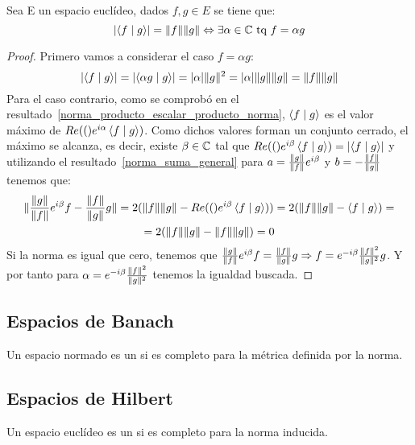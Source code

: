 \begin{resultado}
  Sea E un espacio euclídeo, dados $f,g\in E$ se tiene que:
  \begin{equation}
    \label{norma_producto_escalar_igual_producto_norma}
    \lvert\left\langle f\mid g\right\rangle\rvert=\lVert f\rVert\lVert g\rVert\Leftrightarrow \exists\alpha\in\mathbb{C}\text{ tq }f=\alpha g
  \end{equation}
\end{resultado}

\begin{proof}
  Primero vamos a considerar el caso $f=\alpha g$:
  \begin{equation*}
    \lvert\left\langle f\mid g\right\rangle\rvert=\lvert\left\langle\alpha g\mid g\right\rangle\rvert=\lvert\alpha\rvert\lVert g\rVert^2=\lvert\alpha\rvert\lVert g\rVert\lVert g\rVert=\lVert f\rVert\lVert g\rVert
  \end{equation*}
  Para el caso contrario, como se comprobó en el resultado~\eqref{norma_producto_escalar_producto_norma}, $\left\langle f\mid g\right\rangle$ es el valor máximo de $Re(()e^{i\alpha}\left\langle f\mid g\right\rangle)$. Como dichos valores forman un conjunto cerrado, el máximo se alcanza, es decir, existe $\beta\in\mathbb{C}$ tal que $Re(()e^{i\beta}\left\langle f\mid g\right\rangle)=\lvert\left\langle f\mid g\right\rangle\rvert$ y utilizando el resultado~\eqref{norma_suma_general} para $a=\frac{\lVert g\rVert}{\lVert f\rVert}e^{i\beta}$ y $b=-\frac{\lVert f\rVert}{\lVert g\rVert}$ tenemos que:
  \begin{multline*}
    \lVert\frac{\lVert g\rVert}{\lVert f\rVert}e^{i\beta}f-\frac{\lVert f\rVert}{\lVert g\rVert}g\rVert=2(\lVert f\rVert\lVert g\rVert-Re(()e^{i\beta}\left\langle f\mid g\right\rangle))=2(\lVert f\rVert\lVert g\rVert-\left\langle f\mid g\right\rangle)=\\
    =2(\lVert f\rVert\lVert g\rVert-\lVert f\rVert\lVert g\rVert)=0
  \end{multline*}
  Si la norma es igual que cero, tenemos que
  $\frac{\lVert g\rVert}{\lVert f\rVert}e^{i\beta}f=\frac{\lVert f\rVert}{\lVert g\rVert}g\Rightarrow f=e^{-i\beta}\frac{\lVert f\rVert^2}{\lVert g\rVert^2}g$. Y por tanto para $\alpha=e^{-i\beta}\frac{\lVert f\rVert^2}{\lVert g\rVert^2}$ tenemos la igualdad buscada.
\end{proof}

\subsection{Espacios de Banach}
\begin{definicion}
  \label{espacio_banach}
  Un espacio normado es un  si es completo para la métrica definida por la norma.
\end{definicion}

\subsection{Espacios de Hilbert}
\begin{definicion}
  \label{espacio_hilbert}
  Un espacio euclídeo es un  si es completo para la norma inducida.
\end{definicion}

